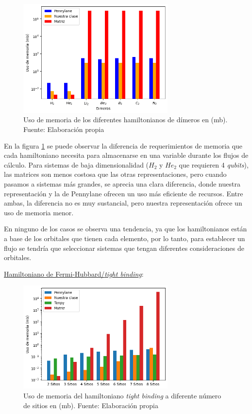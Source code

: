 \begin{figure}[H]
\centering
\includegraphics[width=0.7\textwidth]{figures/S4/moleculas/usomemoriamols.png}
\caption{\label{fig:20} Uso de memoria de los diferentes hamiltonianos de dímeros en (mb). Fuente: Elaboración propia}
\end{figure}

En la figura \ref{fig:20} se puede observar la diferencia de requerimientos de memoria que cada hamiltoniano necesita para almacenarse en una variable durante los flujos de cálculo. Para sistemas de baja dimensionalidad ($H_2$ y $He_2$ que requieren 4 \textit{qubits}), las matrices son menos costosa que las otras representaciones, pero cuando pasamos a sistemas más grandes, se aprecia una clara diferencia, donde nuestra representación y la de Pennylane ofrecen un uso más eficiente de recursos. Entre ambas, la diferencia no es muy sustancial, pero nuestra representación ofrece un uso de memoria menor.

En ninguno de los casos se observa una tendencia, ya que los hamiltonianos están a base de los orbitales que tienen cada elemento, por lo tanto, para establecer un flujo se tendría que seleccionar sistemas que tengan diferentes consideraciones de orbitales.



\underline{Hamiltoniano de Fermi-Hubbard/\textit{tight binding}}:

\begin{figure}[H]
\centering
\includegraphics[width=0.7\textwidth]{figures/S4/tb/usomemoriatb.png}
\caption{\label{fig:21} Uso de memoria del hamiltoniano \textit{tight binding} a diferente número de sitios en (mb). Fuente: Elaboración propia}
\end{figure}


